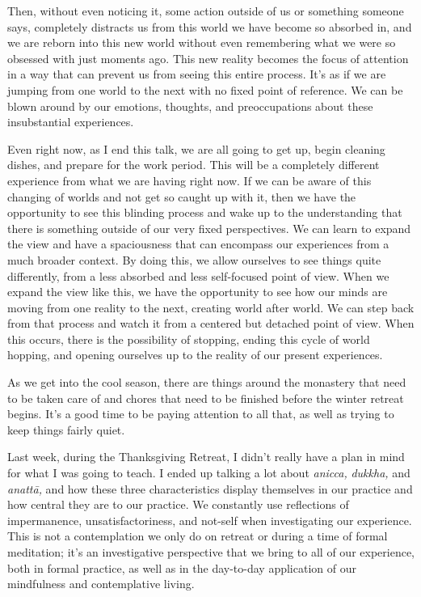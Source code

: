 Then, without even noticing it, some action outside of us or something 
someone says, completely distracts us from this world we have become so 
absorbed in, and we are reborn into this new world without even 
remembering what we were so obsessed with just moments ago. This new 
reality becomes the focus of attention in a way that can prevent us 
from seeing this entire process. It's as if we are jumping from one 
world to the next with no fixed point of reference. We can be blown 
around by our emotions, thoughts, and preoccupations about these 
insubstantial experiences.

Even right now, as I end this talk, we are all going to get up, begin 
cleaning dishes, and prepare for the work period. This will be a 
completely different experience from what we are having right now. If 
we can be aware of this changing of worlds and not get so caught up 
with it, then we have the opportunity to see this blinding process and 
wake up to the understanding that there is something outside of our 
very fixed perspectives. We can learn to expand the view and have a 
spaciousness that can encompass our experiences from a much broader 
context. By doing this, we allow ourselves to see things quite 
differently, from a less absorbed and less self-focused point of view. 
When we expand the view like this, we have the opportunity to see how 
our minds are moving from one reality to the next, creating world after 
world. We can step back from that process and watch it from a centered 
but detached point of view. When this occurs, there is the possibility 
of stopping, ending this cycle of world hopping, and opening ourselves 
up to the reality of our present experiences.


As we get into the cool season, there are things around the monastery 
that need to be taken care of and chores that need to be finished 
before the winter retreat begins. It's a good time to be paying 
attention to all that, as well as trying to keep things fairly quiet.

Last week, during the Thanksgiving Retreat, I didn't really have a plan 
in mind for what I was going to teach. I ended up talking a lot about 
\emph{anicca,} \emph{dukkha,} and \emph{anattā,} and how these three 
characteristics display themselves in our practice and how central they 
are to our practice. We constantly use reflections of impermanence, 
unsatisfactoriness, and not-self when investigating our experience. 
This is not a contemplation we only do on retreat or during a time of 
formal meditation; it's an investigative perspective that we bring to 
all of our experience, both in formal practice, as well as in the 
day-to-day application of our mindfulness and contemplative living.

